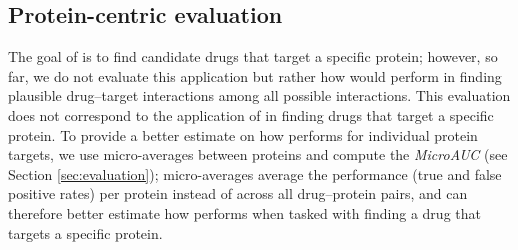 \documentclass{bioinfo}
\begin{document}
\subsection{Protein-centric evaluation}
The goal of \name is to find candidate drugs that target a specific
protein; however, so far, we do not evaluate this application
but rather how \name would perform in finding plausible drug--target
interactions among all possible interactions. This evaluation does not
correspond to the application of \name in finding drugs that target a
specific protein.
To provide a better
estimate on how \name performs for individual protein targets, we use
micro-averages between proteins and compute the \textit{MicroAUC} (see
Section \ref{sec:evaluation}); micro-averages average the performance
(true and false positive rates) per protein instead of across all
drug--protein pairs, and can therefore better estimate how \name
performs when tasked with finding a drug that targets a specific
protein.

\end{document}
